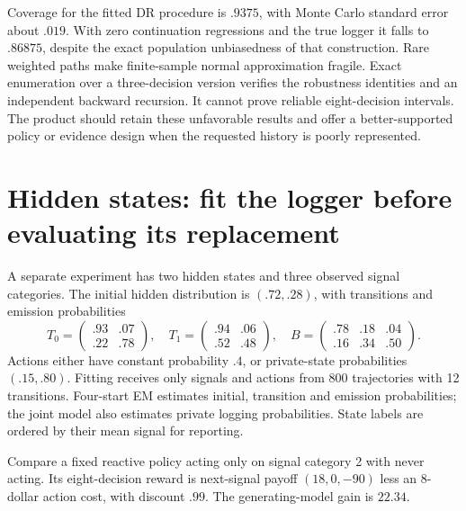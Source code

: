 \begin{table}[htbp]\centering\small

\caption{160 repeated synthetic experiments, each with 600 training and
2,000 evaluation trajectories. Bias identities do not guarantee normal
interval accuracy at this sample size.}
\label{r3:collections-coverage}
\end{table}

Coverage for the fitted DR procedure is $.9375$, with Monte Carlo
standard error about $.019$. With zero continuation regressions and
the true logger it falls to $.86875$, despite the exact population
unbiasedness of that construction. Rare weighted paths make finite-sample
normal approximation fragile. Exact enumeration over a three-decision
version verifies the robustness identities and an independent backward
recursion. It cannot prove reliable eight-decision intervals.
The product should retain these unfavorable results and offer a
better-supported policy or evidence design when the requested history
is poorly represented.

\section{Hidden states: fit the logger before evaluating its replacement}
\label{r3:latent-study}

A separate experiment has two hidden states and three observed signal
categories. The initial hidden distribution is $(.72,.28)$, with
transitions and emission probabilities
\[
 T_0=\begin{pmatrix}.93&.07\\.22&.78\end{pmatrix},\quad
 T_1=\begin{pmatrix}.94&.06\\.52&.48\end{pmatrix},\quad
 B=\begin{pmatrix}.78&.18&.04\\.16&.34&.50\end{pmatrix}.
\]
Actions either have constant probability $.4$, or private-state
probabilities $(.15,.80)$. Fitting receives only signals and actions
from 800 trajectories with 12 transitions. Four-start EM estimates
initial, transition and emission probabilities; the joint model also
estimates private logging probabilities. State labels are ordered by
their mean signal for reporting.

Compare a fixed reactive policy acting only on signal category 2 with
never acting. Its eight-decision reward is next-signal payoff
$(18,0,-90)$ less an $8$-dollar action cost, with discount $.99$.
The generating-model gain is $22.34$.

